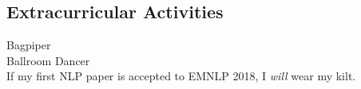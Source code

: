 \documentclass[margin, 10pt]{res} %
\begin{document}
\begin{resume}

\section{Extracurricular Activities} 

Bagpiper \\
Ballroom Dancer\\
If my first NLP paper is accepted to EMNLP 2018, I \emph{will} wear my kilt.


\end{resume}
\end{document}
